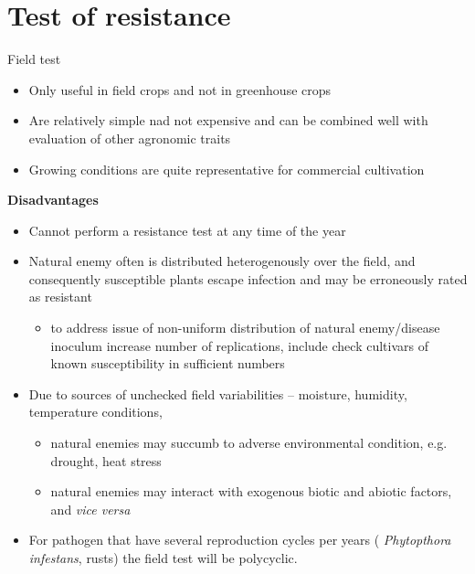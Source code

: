 \documentclass[11pt,dvipsnames,ignorenonframetext,aspectratio=169]{beamer}
\providecommand{\tightlist}{%
  \setlength{\itemsep}{0pt}\setlength{\parskip}{0pt}}
\begin{document}
\hypertarget{test-of-resistance}{%
\section{Test of resistance}\label{test-of-resistance}}

\begin{frame}{Field test}
\protect\hypertarget{field-test}{}
\small

\begin{itemize}
\tightlist
\item
  Only useful in field crops and not in greenhouse crops
\item
  Are relatively simple nad not expensive and can be combined well with
  evaluation of other agronomic traits
\item
  Growing conditions are quite representative for commercial cultivation
\end{itemize}

\footnotesize

\textbf{Disadvantages}

\begin{itemize}
\tightlist
\item
  Cannot perform a resistance test at any time of the year
\item
  Natural enemy often is distributed heterogenously over the field, and
  consequently susceptible plants escape infection and may be
  erroneously rated as resistant

  \begin{itemize}
  \footnotesize
  \item to address issue of non-uniform distribution of natural enemy/disease inoculum increase number of replications, include check cultivars of known susceptibility in sufficient numbers
  \end{itemize}
\item
  Due to sources of unchecked field variabilities -- moisture, humidity,
  temperature conditions,

  \begin{itemize}
  \footnotesize
  \item natural enemies may succumb to adverse environmental condition, e.g. drought, heat stress
  \item natural enemies may interact with exogenous biotic and abiotic factors, and \textit{vice versa}
  \end{itemize}
\item
  For pathogen that have several reproduction cycles per years (
  \emph{Phytopthora infestans}, rusts) the field test will be
  polycyclic.
\end{itemize}
\end{frame}
\end{document}
